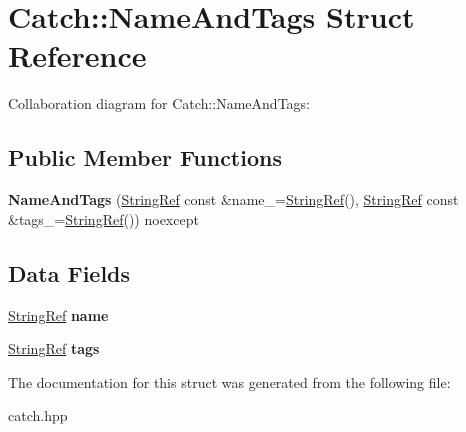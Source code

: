 \hypertarget{structCatch_1_1NameAndTags}{}\section{Catch\+:\+:Name\+And\+Tags Struct Reference}
\label{structCatch_1_1NameAndTags}


Collaboration diagram for Catch\+:\+:Name\+And\+Tags\+:
\subsection*{Public Member Functions}
\begin{DoxyCompactItemize}
\item 
\mbox{\label{structCatch_1_1NameAndTags_ab585111e615ce8c504a2b9630de8ee94}} 
{\bfseries Name\+And\+Tags} (\hyperlink{classCatch_1_1StringRef}{String\+Ref} const \&name\+\_\+=\hyperlink{classCatch_1_1StringRef}{String\+Ref}(), \hyperlink{classCatch_1_1StringRef}{String\+Ref} const \&tags\+\_\+=\hyperlink{classCatch_1_1StringRef}{String\+Ref}()) noexcept
\end{DoxyCompactItemize}
\subsection*{Data Fields}
\begin{DoxyCompactItemize}
\item 
\mbox{\label{structCatch_1_1NameAndTags_a7cbea60e0cebfa622c667008eb011420}} 
\hyperlink{classCatch_1_1StringRef}{String\+Ref} {\bfseries name}
\item 
\mbox{\label{structCatch_1_1NameAndTags_a74062ed1138834a348424eb7ed900c57}} 
\hyperlink{classCatch_1_1StringRef}{String\+Ref} {\bfseries tags}
\end{DoxyCompactItemize}


The documentation for this struct was generated from the following file\+:\begin{DoxyCompactItemize}
\item 
catch.\+hpp\end{DoxyCompactItemize}
